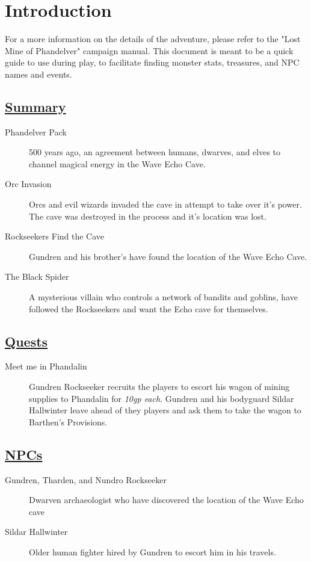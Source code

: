 \section{Introduction}

For a more information on the details of the adventure, please refer to the "Lost Mine of Phandelver" campaign manual. This document is meant to be a quick guide to use during play, to facilitate finding monster stats, treasures, and NPC names and events.
	
\subsection{\underline{Summary}}
\begin{description}
	\item[Phandelver Pack] 500 years ago, an agreement between humans, dwarves, and elves to channel magical energy in the Wave Echo Cave.
	\item[Orc Invasion] Orcs and evil wizards invaded the cave in attempt to take over it's power. The cave was destroyed in the process and it's location was lost.
	\item[Rockseekers Find the Cave] Gundren and his brother's have found the location of the Wave Echo Cave.
	\item[The Black Spider] A mysterious villain who controls a network of bandits and goblins, have followed the Rockseekers and want the Echo cave for themselves.
\end{description}

\subsection{\underline{Quests}}
\begin{description}
	\item[Meet me in Phandalin] Gundren Rockseeker recruits the players to escort his wagon of mining supplies to Phandalin for \emph{10gp each}. Gundren and his bodyguard Sildar Hallwinter leave ahead of they players and ask them to take the wagon to Barthen's Provisions.
\end{description}

\subsection{\underline{NPCs}}
\begin{description}
	\item[Gundren, Tharden, and Nundro Rockseeker] Dwarven archaeologist who have discovered the location of the Wave Echo cave
	\item[Sildar Hallwinter] Older human fighter hired by Gundren to escort him in his travels.
\end{description}